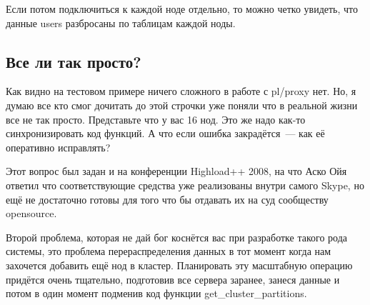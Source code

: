 Если потом подключиться к каждой ноде отдельно, то можно четко увидеть, что данные users разбросаны по таблицам каждой ноды.

\subsection{Все ли так просто?}

Как видно на тестовом примере ничего сложного в работе с pl/proxy нет. Но, я думаю все кто смог дочитать до этой строчки уже поняли что в реальной жизни все не так просто. Представьте что у вас 16 нод. Это же надо как-то синхронизировать код функций. А что если ошибка закрадётся~--- как её оперативно исправлять?

Этот вопрос был задан и на конференции Highload++ 2008, на что Аско Ойя ответил что соответствующие средства уже реализованы внутри самого Skype, но ещё не достаточно готовы для того что бы отдавать их на суд сообществу opensource.

Второй проблема, которая не дай бог коснётся вас при разработке такого рода системы, это проблема перераспределения данных в тот момент когда нам захочется добавить ещё нод в кластер. Планировать эту масштабную операцию придётся очень тщательно, подготовив все сервера заранее, занеся данные и потом в один момент подменив код функции get\_cluster\_partitions.